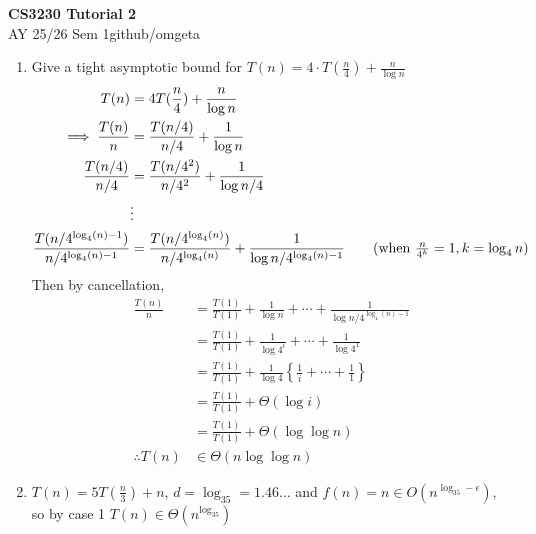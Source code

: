 \documentclass[12pt, a4paper]{article}
\newcommand{\mytitle}{CS3230 Tutorial 2}
\newcommand{\myauthor}{github/omgeta}
\newcommand{\mydate}{AY 25/26 Sem 1}
\begin{document}
\raggedright
\footnotesize
\begin{center}
{\normalsize{\textbf{\mytitle}}} \\
{\footnotesize{\mydate\hspace{2pt}\textemdash\hspace{2pt}\myauthor}}
\end{center}

\begin{enumerate}[Q\arabic*).]
  \item Give a tight asymptotic bound for $T(n) = 4\cdot T(\frac{n}{4}) + \frac{n}{\log n}$
    \begin{align*}
      T(n) &= 4T(\frac{n}{4}) + \frac{n}{\log n}\\
      \implies \frac{T(n)}{n} &= \frac{T(n /4)}{n /4} + \frac{1}{\log n}\\
      \frac{T(n /4)}{n /4} &= \frac{T(n /4^2)}{n /4^2} + \frac{1}{\log n /4}\\
                           &\vdots\\
      \frac{T(n /4^{\log_4(n)-1})}{n /4^{\log_4(n)-1}} &= \frac{T(n /4^{\log_4(n)})}{n /4^{\log_4(n)}} + \frac{1}{\log n /4^{\log_4(n)-1}}\tag*{(when $\frac{n}{4^k} = 1, k = \log_4 n$)}
    \end{align*}
    Then by cancellation,
    \begin{align*}
      \frac{T(n)}{n} &= \frac{T(1)}{T(1)} + \frac{1}{\log n} + \cdots + \frac{1}{\log n/4^{\log_4(n)-1}}\\
                     &= \frac{T(1)}{T(1)} + \frac{1}{\log 4^i} + \cdots + \frac{1}{\log 4^1}\tag*{(let $n=4^i$)}\\
                     &= \frac{T(1)}{T(1)} + \frac{1}{\log 4}\left\{\frac{1}{i} + \cdots + \frac{1}{1}\right\}\tag*{(let $n=4^i$)}\\
                     &= \frac{T(1)}{T(1)} + \Theta(\log i)\tag*{(harmonic sum)}\\
                     &= \frac{T(1)}{T(1)} + \Theta(\log \log n)\\
      \therefore T(n) &\in \Theta(n\log\log n)
    \end{align*}

  \item $T(n) = 5T(\frac{n}{3}) + n$, $d = \log_35 = 1.46\dots$ and $f(n) = n \in O(n^{\log_35-\epsilon})$, so by case 1 $T(n) \in \Theta(n^{\log_35})$


\end{enumerate}
\end{document}
